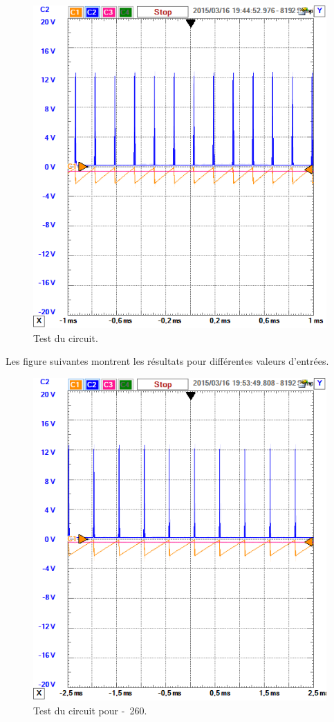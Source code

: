 \begin{figure}[ht]
	\centering
	\includegraphics[scale=0.7]{img/circuit-test-440mv.png}
	\caption{Test du circuit.}
	\label{fig:test-440}
\end{figure}

Les figure suivantes montrent les résultats pour
différentes valeurs d'entrées.

\begin{figure}[ht]
	\centering
	\includegraphics[scale=0.7]{img/circuit-test-260mv.png}
	\caption{Test du circuit pour \unit{-260}{\milli\volt}.}
	\label{fig:test-260}
\end{figure}

